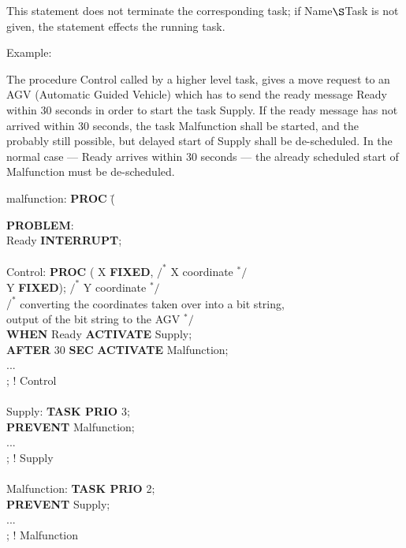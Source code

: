 This statement does not terminate the corresponding task; if
Name$\S $Task is not given, the statement effects the running task.

Example:

The procedure Control called by a higher level task, gives a move
request to an AGV (Automatic Guided Vehicle) which has to send the ready message Ready within
30 seconds in order to start the task Supply. If the ready message has not
arrived within 30 seconds, the task Malfunction shall be started, and
the probably still possible, but delayed start of Supply shall be
de-scheduled. In the normal case --- Ready arrives within 30 seconds
--- the already scheduled start of Malfunction must be de-scheduled.

\begin{tabbing}
\x malfunction: \= {\bf PROC} (\= \kill

{\bf PROBLEM}: \> \> \\
 \> Ready {\bf INTERRUPT}; \> \\
   \> \> \\
\x Control:      \> {\bf PROC} (\> X {\bf FIXED},  $/^*$ X coordinate $^*/$ \\
   \>             \> Y {\bf FIXED}); $/^*$ Y coordinate $^*/$ \\
   \> $/^*$ converting the coordinates taken over into a bit string, \> \\
   \> output of the bit string to the AGV $^*/$ \> \\
   \> {\bf WHEN} Ready {\bf ACTIVATE} Supply; \> \\
   \> {\bf AFTER} 30 {\bf SEC} {\bf ACTIVATE} Malfunction; \> \\
   \> ... \> \\
\x {}; \> ! Control \> \\
   \> \> \\
\x Supply:       \> {\bf TASK PRIO} 3; \> \\
   \> {\bf PREVENT} Malfunction; \> \\
   \> ... \> \\
\x {}; \> ! Supply \> \\
   \> \> \\
\x Malfunction:  \> {\bf TASK PRIO} 2; \> \\
   \> {\bf PREVENT} Supply; \> \\
   \> ... \> \\
\x {}; \> ! Malfunction \>
\end{tabbing}

